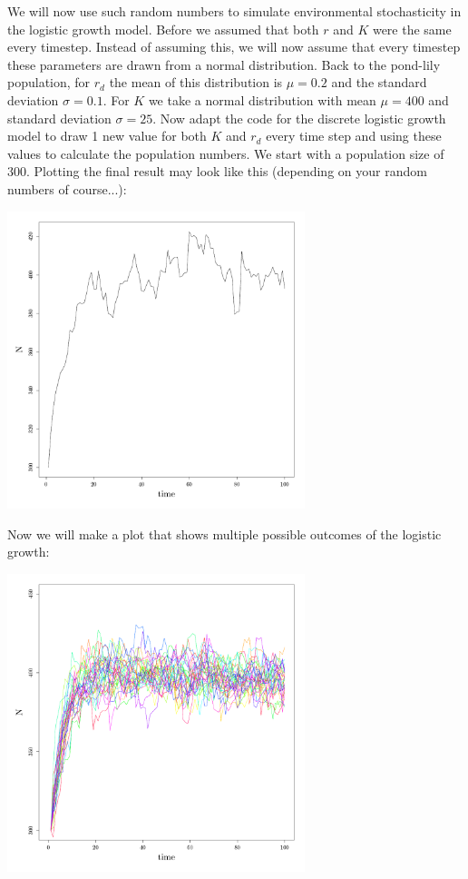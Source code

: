 \documentclass{article}\usepackage[]{graphicx}\usepackage[]{color}
\newenvironment{knitrout}{}{} %
\begin{document}
We will now use such random numbers to simulate environmental stochasticity in the logistic growth model. Before we assumed that both $r$ and $K$ were the same every timestep. Instead of assuming this, we will now assume that every timestep these parameters are drawn from a normal distribution. Back to the pond-lily population, for $r_d$ the mean of this distribution is $\mu=0.2$ and the standard deviation $\sigma = 0.1$. For $K$ we take a normal distribution with mean $\mu=400$ and standard deviation $\sigma = 25$. Now adapt the code for the discrete logistic growth model to draw 1 new value for both $K$ and $r_d$ every time step and using these values to calculate the population numbers. We start with a population size of $300$. Plotting the final result may look like this (depending on your random numbers of course...):
\begin{knitrout}
\color{fgcolor}

{\centering \includegraphics[width=0.65\textwidth]{figure/k21-1} 

}



\end{knitrout}
Now we will make a plot that shows multiple possible outcomes of the logistic growth:
\begin{knitrout}
\color{fgcolor}

{\centering \includegraphics[width=0.65\textwidth]{figure/k22-1} 

}



\end{knitrout}
\end{document}
